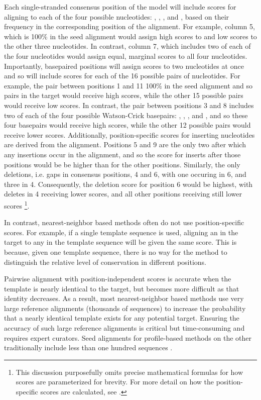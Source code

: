 Each single-stranded consensus position of the model will
include scores for aligning to each of the four possible nucleotides:
, , , and , based on their frequency
in the corresponding position of the alignment. For example, column 5,
which is 100\%  in the seed alignment would assign high scores
to  and low scores to the other three nucleotides. In contrast,
column 7, which includes two of each of the four nucleotides would
assign equal, marginal scores to all four nucleotides.
Importantly, basepaired positions will
assign scores to two nucleotides at once and so will include scores
for each of the 16 possible pairs of nucleotides. For example, the
pair between positions 1 and 11 100\%  in the seed alignment
and so  pairs in the target would receive high scores, while
the other 15 possible pairs would receive low scores. In contrast, the
pair between positions 3 and 8 includes two of each of the four
possible Watson-Crick basepairs: , , , and
, and so these four basepairs would receive high scores,
while the other 12 possible pairs would receive lower
scores. Additionally, position-specific scores for inserting
nucleotides are derived from the alignment. Positions 5 and 9 are the only two
after which any insertions occur in the alignment, and so the score
for inserts after those positions would be be higher than for the other
positions. Similarly, the only deletions, i.e. gaps in consensus
positions, 4 and 6, with one occuring in 6, and three in
4. Consequently, the deletion score for
position 6 would be highest, with deletes in 4 receiving lower scores,
and all other positions receiving still lower scores
\footnote{This discussion
  purposefully omits precise mathematical formulas for how scores are
  parameterized for brevity. For
  more detail on how the position-specific scores are calculated, see 
  .}. 

In contrast, nearest-neighbor based methods often do not use
position-specific scores. For example, if a single template sequence
is used,  aligning an  in the target to any  in the
template sequence will be given the same score. This is because, given
one template sequence, there is no way for the method to distinguish
the relative level of conservation in different positions.

Pairwise alignment with position-independent scores is accurate when
the template is nearly identical to the target, but becomes more
difficult as that identity decreases. As a result, most
nearest-neighbor based methods use very large reference alignments
(thousands of sequences) to increase the probability that a nearly
identical template exists for any potential target. Ensuring the
accuracy of such large reference alignments is critical 
but time-consuming and requires expert curators. 
Seed alignments for profile-based methods on the other
traditionally include less than one hundred sequences
\cite{Finn10,Gardner09}.

